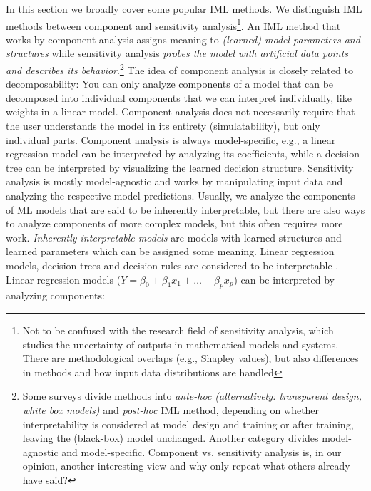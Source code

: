 \documentclass[runningheads]{llncs}
\begin{document}
In this section we broadly cover some popular IML methods.
We distinguish IML methods between component and sensitivity analysis\footnote{Not to be confused with the research field of sensitivity analysis, which studies the uncertainty of outputs in mathematical models and systems. There are methodological overlaps (e.g., Shapley values), but also differences in methods and how input data distributions are handled}.
An IML method that works by component analysis assigns meaning to \textit{(learned) model parameters and structures} while sensitivity analysis \textit{probes the model with artificial data points and describes its behavior}.\footnote{Some surveys \cite{vilone2020explainable,guidotti2018survey,du2019techniques} divide methods into \textit{ante-hoc (alternatively: transparent design, white box models)} and \textit{post-hoc} IML method, depending on whether interpretability is considered at model design and training or after training, leaving the (black-box) model unchanged. Another category divides model-agnostic and model-specific. Component vs. sensitivity analysis is, in our opinion, another interesting view and why only repeat what others already have said?}
The idea of component analysis is closely related to decomposability:
You can only analyze components of a model that can be decomposed into individual components that we can interpret individually, like weights in a linear model.
Component analysis does not necessarily require that the user understands the model in its entirety (simulatability), but only individual parts.
Component analysis is always model-specific, e.g., a linear regression model can be interpreted by analyzing its coefficients, while a decision tree can be interpreted by visualizing the learned decision structure.
Sensitivity analysis is mostly model-agnostic and works by manipulating input data and analyzing the respective model predictions.
Usually, we analyze the components of ML models that are said to be inherently interpretable, but there are also ways to analyze components of more complex models, but this often requires more work.
\textit{Inherently interpretable models} are models with learned structures and learned parameters which can be assigned some meaning.
Linear regression models, decision trees and decision rules are considered to be interpretable \cite{freitas2014comprehensible,huysmans2011empirical}.
Linear regression models ($Y = \beta_0 + \beta_1 x_1 + \ldots + \beta_p x_p$) can be interpreted by analyzing components:
\end{document}
